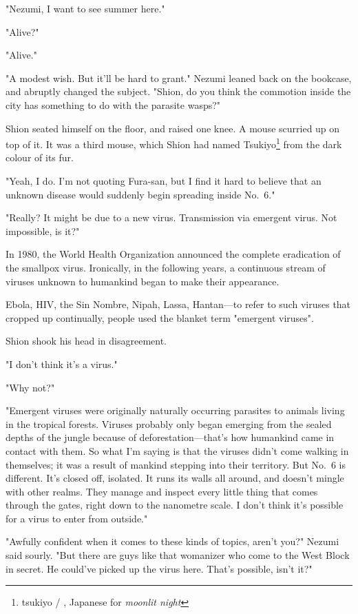 "Nezumi, I want to see summer here."

"Alive?"

"Alive."

"A modest wish. But it'll be hard to grant." Nezumi leaned back on the
bookcase, and abruptly changed the subject. "Shion, do you think the
commotion inside the city has something to do with the parasite wasps?"

Shion seated himself on the floor, and raised one knee. A mouse scurried
up on top of it. It was a third mouse, which Shion had named Tsukiyo\footnote{tsukiyo / , Japanese for \emph{moonlit night}}
from the dark colour of its fur.

"Yeah, I do. I'm not quoting Fura-san, but I find it hard to believe
that an unknown disease would suddenly begin spreading inside No.~6."

"Really? It might be due to a new virus. Transmission via emergent
virus. Not impossible, is it?"

In 1980, the World Health Organization announced the complete
eradication of the smallpox virus. Ironically, in the following years, a
continuous stream of viruses unknown to humankind began to make their
appearance.

Ebola, HIV, the Sin Nombre, Nipah, Lassa, Hantan---to refer to such
viruses that cropped up continually, people used the blanket term
"emergent viruses".

Shion shook his head in disagreement.

"I don't think it's a virus."

"Why not?"

"Emergent viruses were originally naturally occurring parasites to
animals living in the tropical forests. Viruses probably only began
emerging from the sealed depths of the jungle because of
deforestation---that's how humankind came in contact with them. So what
I'm saying is that the viruses didn't come walking in themselves; it was
a result of mankind stepping into their territory. But No.~6 is
different. It's closed off, isolated. It runs its walls all around, and
doesn't mingle with other realms. They manage and inspect every little
thing that comes through the gates, right down to the nanometre scale. I
don't think it's possible for a virus to enter from outside."

"Awfully confident when it comes to these kinds of topics, aren't you?"
Nezumi said sourly. "But there are guys like that womanizer who come to
the West Block in secret. He could've picked up the virus here. That's
possible, isn't it?"

